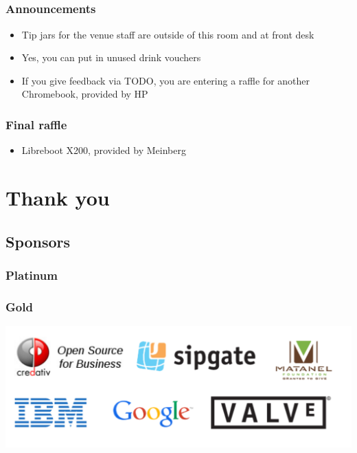 \documentclass[t]{beamer}
\begin{document}
\subsection{}

\begin{frame}
	\frametitle{Announcements}
	\begin{itemize}
		\item Tip jars for the venue staff are outside of this room and at front desk
		\item Yes, you can put in unused drink vouchers %
		\item If you give feedback via TODO, you are entering a raffle for another Chromebook, provided by HP
	\end{itemize}
\end{frame}

\begin{frame}
	\frametitle{Final raffle}
	\begin{itemize}
		\item Libreboot X200, provided by Meinberg
	\end{itemize}
\end{frame}


\section{Thank you}

\subsection{Sponsors}

\begin{frame}
	\frametitle{Platinum}
\end{frame}

\begin{frame}
	\frametitle{Gold}
	\begin{center}
	\includegraphics[scale=0.5]{images2/sponsors/gold.pdf}
	\end{center}

\end{frame}
\end{document}
